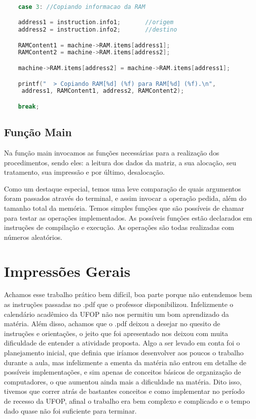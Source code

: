 \documentclass{article}
\begin{document}
\begin{lstlisting}[caption={OpCode 3},label={lst:cod6},language=C]

    case 3: //Copiando informacao da RAM

    address1 = instruction.info1;       //origem
    address2 = instruction.info2;       //destino

    RAMContent1 = machine->RAM.items[address1];
    RAMContent2 = machine->RAM.items[address2];

    machine->RAM.items[address2] = machine->RAM.items[address1];

    printf("  > Copiando RAM[%d] (%f) para RAM[%d] (%f).\n",
     address1, RAMContent1, address2, RAMContent2);

    break;

\end{lstlisting}

\clearpage
\subsection{Função Main}

Na função main invocamos as funções necessárias para a realização dos procedimentos, sendo eles: a leitura dos dados da matriz, a sua alocação, seu tratamento, sua impressão e por último, desalocação.

Como um destaque especial, temos uma leve comparação de quais argumentos foram passados através do terminal, e assim invocar a operação pedida, além do tamanho total da memória. Temos simples funções que são possíveis de chamar
para testar as operações implementados. As possíveis funções estão declarados em instruções de compilação e execução. As operações são todas realizadas com números aleatórios.


\clearpage


\section{Impressões Gerais}

Achamos esse trabalho prático bem difícil, boa parte porque não entendemos bem as instruções passadas no .pdf que o professor disponibilizou. Infelizmente o calendário acadêmico da UFOP não nos permitiu um bom aprendizado da matéria. Além disso, achamos que o .pdf deixou a desejar no quesito de instruções e orientações, o jeito que foi apresentado nos deixou com muita dificuldade de entender a atividade proposta. Algo a ser levado em conta foi o planejamento inicial, que definia que iríamos desenvolver  aos poucos o trabalho durante a aula, mas infelizmente a ementa da matéria não entrou em detalhe de possíveis implementações, e sim apenas de conceitos básicos de organização de computadores, o que aumentou ainda mais a dificuldade na matéria. Dito isso, tivemos que correr atrás de bastantes conceitos e como implementar no período de recesso da UFOP, afinal o trabalho era bem complexo e complicado e o tempo dado quase não foi suficiente para terminar.
\end{document}
